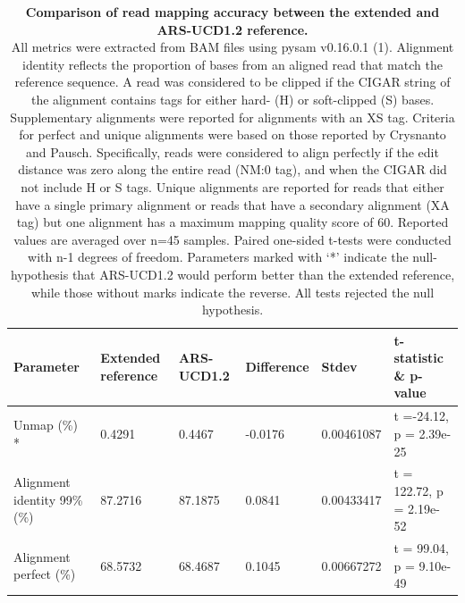 \documentclass[../main.tex]{subfiles}
\begin{document}
\begin{flushleft}
\begin{landscape}

    \begin{table}
        \centering
        \caption[Mapping comparison between linear genome and the pangenome]{\textbf{Comparison of read mapping accuracy between the extended and ARS-UCD1.2 reference.} \\
        \footnotesize{All metrics were extracted from BAM files using pysam v0.16.0.1 (1). Alignment identity reflects the proportion of bases from an aligned read that match the reference sequence. A read was considered to be clipped if the CIGAR string of the alignment contains tags for either hard- (H) or soft-clipped (S) bases. Supplementary alignments were reported for alignments with an XS tag. Criteria for perfect and unique alignments were based on those reported by Crysnanto and Pausch. Specifically, reads were considered to align perfectly if the edit distance was zero along the entire read (NM:0 tag), and when the CIGAR did not include H or S tags. Unique alignments are reported for reads that either have a single primary alignment or reads that have a secondary alignment (XA tag) but one alignment has a maximum mapping quality score of 60. Reported values are averaged over n=45 samples. Paired one-sided t-tests were conducted with n-1 degrees of freedom. Parameters marked with ‘*’ indicate the null-hypothesis that ARS-UCD1.2 would perform better than the extended reference, while those without marks indicate the reverse. All tests rejected the null hypothesis.
        }}
        \bigskip
        \bigskip
        \centering
        \label{sup_tab:s44}
            \begin{tabular}{|l|l|l|l|l|l|}
            \hline
            \textbf{Parameter}             & \textbf{Extended reference} & \textbf{ARS-UCD1.2} & \textbf{Difference} & \textbf{Stdev} & \textbf{t-statistic \& p-value}  \\
            \hline
            Unmap (\%) *                   & 0.4291                      & 0.4467              & -0.0176             & 0.00461087     & t =-24.12, p = 2.39e-25          \\
            \hline
            Alignment identity 99\% (\%)   & 87.2716                     & 87.1875             & 0.0841              & 0.00433417     & t = 122.72, p = 2.19e-52         \\
            \hline
            Alignment perfect (\%)         & 68.5732                     & 68.4687             & 0.1045              & 0.00667272     & t = 99.04, p = 9.10e-49          \\

\end{tabular}
\end{table}
\end{landscape}
\end{flushleft}
\end{document}
